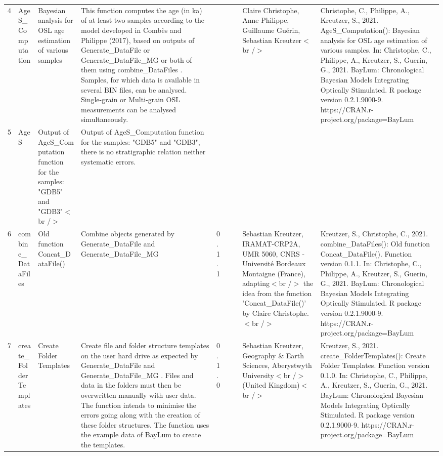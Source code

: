 \begin{table}[ht]
\begin{tabular}{rllllllll}
 \\ 
  4 & AgeS\_Computation & Bayesian analysis for OSL age estimation of various samples & This function computes the age (in ka) of at least two samples according to the model developed in Combès and Philippe (2017), based on outputs of  Generate\_DataFile  or  Generate\_DataFile\_MG  or both of them using  combine\_DataFiles .  Samples, for which data is available in several BIN files, can be analysed.  Single-grain or Multi-grain OSL measurements can be analysed simultaneously. &  &  &  & Claire Christophe, Anne Philippe, Guillaume Guérin, Sebastian Kreutzer$<$br /$>$ & Christophe, C., Philippe, A., Kreutzer, S., 2021. AgeS\_Computation(): Bayesian analysis for OSL age estimation of various samples. In: Christophe, C., Philippe, A., Kreutzer, S., Guerin, G., 2021. BayLum: Chronological Bayesian Models Integrating Optically Stimulated. R package version 0.2.1.9000-9. https://CRAN.r-project.org/package=BayLum
 \\ 
  5 & AgeS & Output of  AgeS\_Computation  function for the samples: "GDB5" and "GDB3"$<$br /$>$ & Output of  AgeS\_Computation  function for the samples: "GDB5" and "GDB3", there is no stratigraphic relation neither systematic errors. &  &  &  &  &  \\ 
  6 & combine\_DataFiles & Old function Concat\_DataFile() & Combine objects generated by  Generate\_DataFile  and  Generate\_DataFile\_MG & 0.1.1
 &  &  & Sebastian Kreutzer, IRAMAT-CRP2A, UMR 5060, CNRS - Université Bordeaux Montaigne (France), adapting$<$br /$>$ the idea from the function 'Concat\_DataFile()' by Claire Christophe.$<$br /$>$ & Kreutzer, S., Christophe, C., 2021. combine\_DataFiles(): Old function Concat\_DataFile(). Function version 0.1.1. In: Christophe, C., Philippe, A., Kreutzer, S., Guerin, G., 2021. BayLum: Chronological Bayesian Models Integrating Optically Stimulated. R package version 0.2.1.9000-9. https://CRAN.r-project.org/package=BayLum
 \\ 
  7 & create\_FolderTemplates & Create Folder Templates & Create file and folder structure templates on the user hard drive as expected by  Generate\_DataFile  and  Generate\_DataFile\_MG . Files and data in the folders must then be overwritten manually with user data. The function intends to minimise the errors going along with the creation of these folder structures. The function uses the example data of  BayLum  to create the templates. & 0.1.0
 &  &  & Sebastian Kreutzer, Geography \& Earth Sciences, Aberystwyth University$<$br /$>$ (United Kingdom)$<$br /$>$ & Kreutzer, S., 2021. create\_FolderTemplates(): Create Folder Templates. Function version 0.1.0. In: Christophe, C., Philippe, A., Kreutzer, S., Guerin, G., 2021. BayLum: Chronological Bayesian Models Integrating Optically Stimulated. R package version 0.2.1.9000-9. https://CRAN.r-project.org/package=BayLum

\end{tabular}
\end{table}
